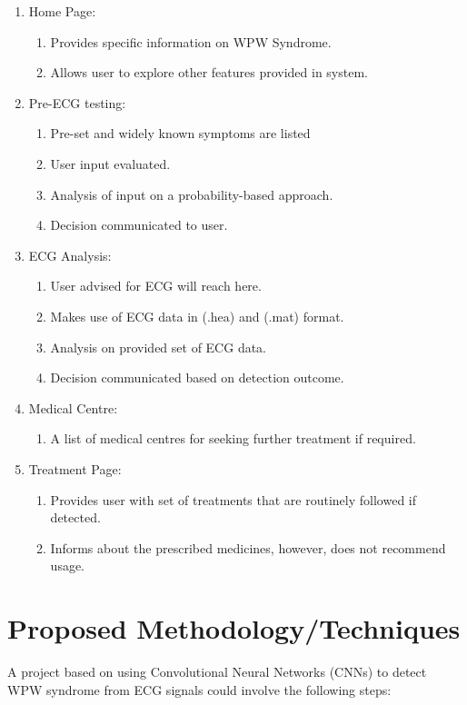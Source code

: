 \begin{enumerate}
	\item  Home Page:  
	\begin{enumerate}
		\item Provides specific information on WPW Syndrome.   
		\item Allows user to explore other features provided in system.
	\end{enumerate}
	\item  Pre-ECG testing:  
	\begin{enumerate}
		\item Pre-set and widely known symptoms are listed 
		\item User input evaluated.
		\item Analysis of input on a probability-based approach. 
		\item Decision communicated to user. 
	\end{enumerate}
	\item ECG Analysis:    
	\begin{enumerate}
		\item User advised for ECG will reach here. 
		\item Makes use of ECG data in (.hea) and (.mat) format.
		\item Analysis on provided set of ECG data.
		\item Decision communicated based on detection outcome.
	\end{enumerate}
	\item Medical Centre:   
	\begin{enumerate}
		\item A list of medical centres for seeking further treatment if required. 
	\end{enumerate} 
	\item Treatment Page:  
	\begin{enumerate}
		\item Provides user with set of treatments that are routinely followed if detected.
		\item Informs about the prescribed medicines, however, does not recommend usage.
	\end{enumerate}
\end{enumerate}


\section{Proposed Methodology/Techniques}

A project based on using Convolutional Neural Networks (CNNs) to detect WPW syndrome from ECG signals could involve the following steps:  

